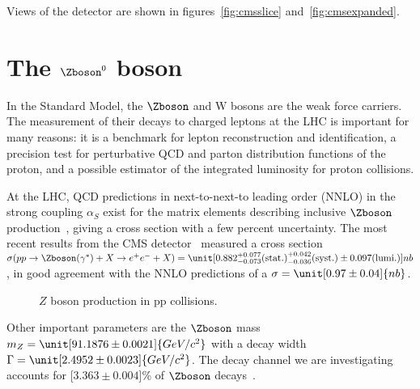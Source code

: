 Views of the detector are shown in figures~\ref{fig:cmsslice} and~\ref{fig:cmsexpanded}.

\section{The $\Zboson^0$ boson}
In the Standard Model, the $\Zboson$ and $\mathrm{W}$ bosons are the weak force carriers. The measurement of their decays to charged leptons at the LHC is important for many reasons: it is a benchmark for lepton reconstruction and identification, a precision test for perturbative QCD and parton distribution functions of the proton, and a possible estimator of the integrated luminosity for proton collisions.

At the LHC, QCD predictions in next-to-next-to leading order (NNLO) in the strong coupling $\alpha_S$ exist for the matrix elements describing inclusive $\Zboson$ production~\cite{ewk:zproduction}, giving a cross section with a few percent uncertainty.
The most recent results from the CMS detector~\cite{ewk:cms.pas.wz.xs} measured a cross section $\sigma(pp\rightarrow \Zboson(\gamma^*) + X \rightarrow e^+e^- + X) = \unit[0.882^{+0.077}_{-0.073}\text{(stat.)}^{+0.042}_{-0.036}\text{(syst.)}\pm0.097\text{(lumi.)}]{nb}$, in good agreement with the NNLO predictions of a $\sigma = \unit[0.97\pm 0.04]{nb}$.
\begin{figure}[hp]
    \begin{center}
        
    \end{center}
    \caption{$Z$ boson production in pp collisions.}
    \label{fig:z.diagram}
\end{figure}
Other important parameters are the $\Zboson$ mass $m_Z = \unit[91.1876\pm 0.0021]{GeV/c^{2}}$ with a decay width $\Gamma = \unit[2.4952\pm 0.0023]{GeV/c^2}$. The decay channel we are investigating accounts for \unit[$3.363\pm0.004$]{\%} of $\Zboson$ decays~\cite{intro:pdg}.



